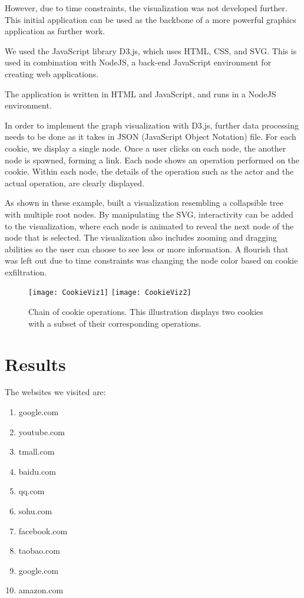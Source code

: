 \documentclass[sigplan,screen]{acmart}
\begin{document}
However, due to time constraints, the visualization was not developed further. This initial application can be used as the backbone of a more powerful graphics application as further work.

We used the JavaScript library D3.js\cite{d3js}, which uses HTML, CSS, and SVG. This is used in combination with NodeJS\cite{nodejs}, a back-end JavaScript environment for creating web applications. 

The application is written in HTML and JavaScript, and runs in a NodeJS environment. 

In order to implement the graph visualization with D3.js, further data processing needs to be done as it takes in JSON (JavaScript Object Notation) file. 
For each cookie, we display a single node. Once a user clicks on each node, the another node is spawned, forming a link. Each node shows an operation performed on the cookie. Within each node, the details of the operation such as the actor and the actual operation, are clearly displayed. 

As shown in these example\cite{bostock_tree}\cite{alien_tree}\cite{box_tree}, built a visualization resembling a collapsible tree with multiple root nodes. By manipulating the SVG, interactivity can be added to the visualization, where each node is animated to reveal the next node of the node that is selected. The visualization also includes zooming and dragging abilities so the user can choose to see less or more information. A flourish that was left out due to time constraints was changing the node color based on cookie exfiltration.

\begin{figure}[htp]
    \centering
    \texttt{[image: CookieViz1]}
    \texttt{[image: CookieViz2]}
    \caption{Chain of cookie operations. This illustration displays two cookies with a subset of their corresponding operations.}
    \label{fig:Cookie visualization}
\end{figure}


\section{Results}
The websites we visited are:
\begin{enumerate}
\item google.com
\item youtube.com
\item tmall.com
\item baidu.com
\item qq.com
\item sohu.com
\item facebook.com
\item taobao.com
\item google.com
\item amazon.com
\end{enumerate}
\end{document}
